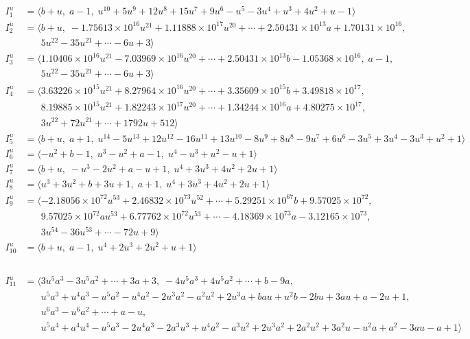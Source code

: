 \documentclass[1p]{elsarticle_modified}
\theoremstyle{definition}
\begin{document}
\begin{align*}
I^u_{1}&=\langle 
b+u,\;a-1,\;u^{10}+5 u^9+12 u^8+15 u^7+9 u^6- u^5-3 u^4+u^3+4 u^2+u-1\rangle \\
I^u_{2}&=\langle 
b+u,\;-1.75613\times10^{16} u^{21}+1.11888\times10^{17} u^{20}+\cdots+2.50431\times10^{13} a+1.70131\times10^{16},\\
\phantom{I^u_{2}}&\phantom{= \langle  }5 u^{22}-35 u^{21}+\cdots-6 u+3\rangle \\
I^u_{3}&=\langle 
1.10406\times10^{16} u^{21}-7.03969\times10^{16} u^{20}+\cdots+2.50431\times10^{13} b-1.05368\times10^{16},\;a-1,\\
\phantom{I^u_{3}}&\phantom{= \langle  }5 u^{22}-35 u^{21}+\cdots-6 u+3\rangle \\
I^u_{4}&=\langle 
3.63226\times10^{15} u^{21}+8.27964\times10^{16} u^{20}+\cdots+3.35609\times10^{15} b+3.49818\times10^{17},\\
\phantom{I^u_{4}}&\phantom{= \langle  }8.19885\times10^{15} u^{21}+1.82243\times10^{17} u^{20}+\cdots+1.34244\times10^{16} a+4.80275\times10^{17},\\
\phantom{I^u_{4}}&\phantom{= \langle  }3 u^{22}+72 u^{21}+\cdots+1792 u+512\rangle \\
I^u_{5}&=\langle 
b+u,\;a+1,\;u^{14}-5 u^{13}+12 u^{12}-16 u^{11}+13 u^{10}-8 u^9+8 u^8-9 u^7+6 u^6-3 u^5+3 u^4-3 u^3+u^2+1\rangle \\
I^u_{6}&=\langle 
- u^2+b-1,\;u^3- u^2+a-1,\;u^4- u^3+u^2- u+1\rangle \\
I^u_{7}&=\langle 
b+u,\;- u^3-2 u^2+a- u+1,\;u^4+3 u^3+4 u^2+2 u+1\rangle \\
I^u_{8}&=\langle 
u^3+3 u^2+b+3 u+1,\;a+1,\;u^4+3 u^3+4 u^2+2 u+1\rangle \\
I^u_{9}&=\langle 
-2.18056\times10^{72} u^{53}+2.46832\times10^{73} u^{52}+\cdots+5.29251\times10^{67} b+9.57025\times10^{72},\\
\phantom{I^u_{9}}&\phantom{= \langle  }9.57025\times10^{72} a u^{53}+6.77762\times10^{72} u^{53}+\cdots-4.18369\times10^{73} a-3.12165\times10^{73},\\
\phantom{I^u_{9}}&\phantom{= \langle  }3 u^{54}-36 u^{53}+\cdots-72 u+9\rangle \\
I^u_{10}&=\langle 
b+u,\;a-1,\;u^4+2 u^3+2 u^2+u+1\rangle \\
\end{align*}\\
\begin{align*}
I^u_{11}&=\langle 
3 u^5 a^3-3 u^5 a^2+\cdots+3 a+3,\;-4 u^5 a^3+4 u^5 a^2+\cdots+b-9 a,\\
\phantom{I^u_{11}}&\phantom{= \langle  }u^5 a^3+u^4 a^3- u^5 a^2- u^4 a^2-2 u^3 a^2- a^2 u^2+2 u^3 a+b a u+u^2 b-2 b u+3 a u+a-2 u+1,\\
\phantom{I^u_{11}}&\phantom{= \langle  }u^6 a^3- u^6 a^2+\cdots+a- u,\\
\phantom{I^u_{11}}&\phantom{= \langle  }u^5 a^4+a^4 u^4- u^5 a^3-2 u^4 a^3-2 a^3 u^3+u^4 a^2- a^3 u^2+2 u^3 a^2+2 a^2 u^2+3 a^2 u- u^2 a+a^2-3 a u- a+1\rangle \\
\\
\end{align*}
\end{document}
